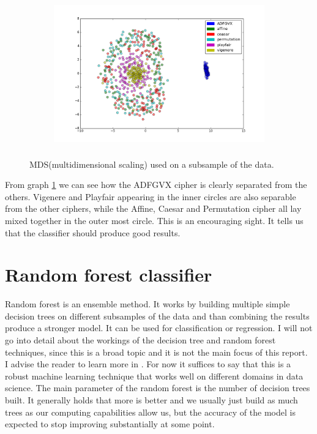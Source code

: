 \documentclass[a4paper]{article}
\begin{document}
\begin{figure}[H]
    \centering
    \begin{subfigure}[h]{0.5\textwidth}
        \centering
        \includegraphics[height=2.5in]{img/mds_features.png}
    \end{subfigure}
    \caption{MDS(multidimensional scaling) used on a subsample of the data.}
    \label{fig:mds}
\end{figure}

From graph \ref{fig:mds} we can see how the ADFGVX cipher is clearly separated from the others. Vigenere and Playfair appearing in the inner circles are also separable from the other ciphers, while the Affine, Caesar and Permutation cipher all lay mixed together in the outer most circle. This is an encouraging sight. It tells us that the classifier should produce good results.

\section*{Random forest classifier}
Random forest is an ensemble method. It works by building multiple simple decision trees on different subsamples of the data and than combining the results produce a stronger model. It can be used for classification or regression. I will not go into detail about the workings of the decision tree and random forest techniques, since this is a broad topic and it is not the main focus of this report. I advise the reader to learn more in \cite{breiman2001random}. For now it suffices to say that this is a robust machine learning technique that works well on different domains in data science. The main parameter of the random forest is the number of decision trees built. It generally holds that more is better and we usually just build as much trees as our computing capabilities allow us, but the accuracy of the model is expected to stop improving substantially at some point.
\end{document}
